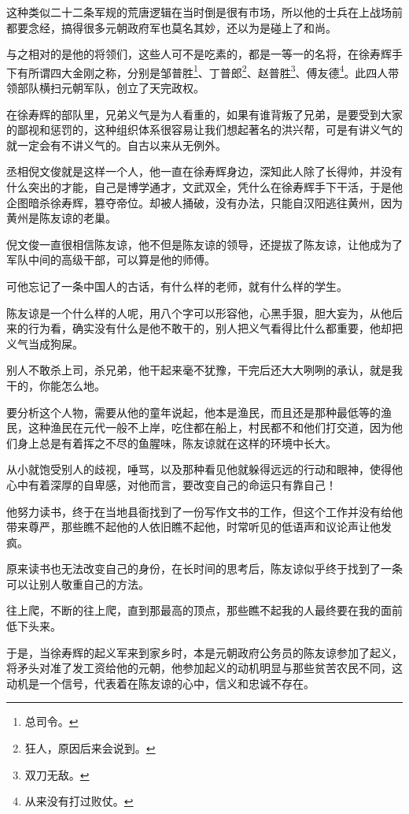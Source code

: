 \begin{multicols}{\theparacolNo}
		这种类似二十二条军规的荒唐逻辑在当时倒是很有市场，所以他的士兵在上战场前都要念经，搞得很多元朝政府军也莫名其妙，还以为是碰上了和尚。

		与之相对的是他的将领们，这些人可不是吃素的，都是一等一的名将，在徐寿辉手下有所谓四大金刚之称，分别是邹普胜\footnote{总司令。}、丁普郎\footnote{狂人，原因后来会说到。}、赵普胜\footnote{双刀无敌。}、傅友德\footnote{从来没有打过败仗。}。此四人带领部队横扫元朝军队，创立了天完政权。

		在徐寿辉的部队里，兄弟义气是为人看重的，如果有谁背叛了兄弟，是要受到大家的鄙视和惩罚的，这种组织体系很容易让我们想起著名的洪兴帮，可是有讲义气的就一定会有不讲义气的。自古以来从无例外。

		丞相倪文俊就是这样一个人，他一直在徐寿辉身边，深知此人除了长得帅，并没有什么突出的才能，自己是博学通才，文武双全，凭什么在徐寿辉手下干活，于是他企图暗杀徐寿辉，篡夺帝位。却被人捅破，没有办法，只能自汉阳逃往黄州，因为黄州是陈友谅的老巢。

		倪文俊一直很相信陈友谅，他不但是陈友谅的领导，还提拔了陈友谅，让他成为了军队中间的高级干部，可以算是他的师傅。

		可他忘记了一条中国人的古话，有什么样的老师，就有什么样的学生。

		陈友谅是一个什么样的人呢，用八个字可以形容他，心黑手狠，胆大妄为，从他后来的行为看，确实没有什么是他不敢干的，别人把义气看得比什么都重要，他却把义气当成狗屎。

		别人不敢杀上司，杀兄弟，他干起来毫不犹豫，干完后还大大咧咧的承认，就是我干的，你能怎么地。

		要分析这个人物，需要从他的童年说起，他本是渔民，而且还是那种最低等的渔民，这种渔民在元代一般不上岸，吃住都在船上，村民都不和他们打交道，因为他们身上总是有着挥之不尽的鱼腥味，陈友谅就在这样的环境中长大。

		从小就饱受别人的歧视，唾骂，以及那种看见他就躲得远远的行动和眼神，使得他心中有着深厚的自卑感，对他而言，要改变自己的命运只有靠自己！

		他努力读书，终于在当地县衙找到了一份写作文书的工作，但这个工作并没有给他带来尊严，那些瞧不起他的人依旧瞧不起他，时常听见的低语声和议论声让他发疯。

		原来读书也无法改变自己的身份，在长时间的思考后，陈友谅似乎终于找到了一条可以让别人敬重自己的方法。

		往上爬，不断的往上爬，直到那最高的顶点，那些瞧不起我的人最终要在我的面前低下头来。

		于是，当徐寿辉的起义军来到家乡时，本是元朝政府公务员的陈友谅参加了起义，将矛头对准了发工资给他的元朝，他参加起义的动机明显与那些贫苦农民不同，这动机是一个信号，代表着在陈友谅的心中，信义和忠诚不存在。


\end{multicols}

